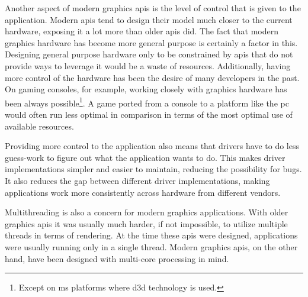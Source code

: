     Another aspect of modern graphics \glspl{api} is the level of control that is given to the application.
    Modern \glspl{api} tend to design their model much closer to the current hardware, exposing it a lot more than older \glspl{api} did.
    The fact that modern graphics hardware has become more general purpose is certainly a factor in this.
    Designing general purpose hardware only to be constrained by \glspl{api} that do not provide ways to leverage it would be a waste of resources.
    Additionally, having more control of the hardware has been the desire of many developers in the past.
    On gaming consoles, for example, working closely with graphics hardware has been always possible\footnote{Except on \gls{ms} platforms where \gls{d3d} technology is used.}.
    A game ported from a console to a platform like the \gls{pc} would often run less optimal in comparison in terms of the most optimal use of available resources.

    Providing more control to the application also means that drivers have to do less guess-work to figure out what the application wants to do.
    This makes driver implementations simpler and easier to maintain, reducing the possibility for \glspl{bug}.
    It also reduces the gap between different driver implementations, making applications work more consistently across hardware from different vendors.


    Multithreading is also a concern for modern graphics applications.
    With older graphics \glspl{api} it was usually much harder, if not impossible, to utilize multiple threads in terms of rendering.
    At the time these \glspl{api} were designed, applications were usually running only in a single thread.
    Modern graphics \glspl{api}, on the other hand, have been designed with multi-core processing in mind.


